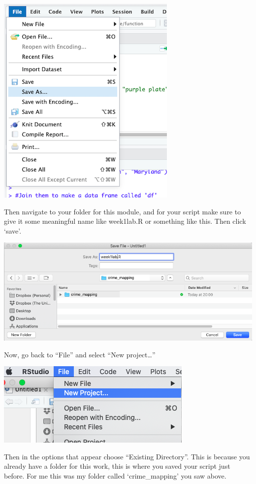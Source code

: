 \documentclass[
]{book}
\begin{document}
\includegraphics{img/save_script_as.png}

Then navigate to your folder for this module, and for your script make sure to give it some meaningful name like week1lab.R or something like this. Then click `save'.

\includegraphics{img/rename_and_save.png}

Now, go back to ``File'' and select ``New project\ldots{}''

\includegraphics{img/file_newproj.png}

Then in the options that appear choose ``Existing Directory''. This is because you already have a folder for this work, this is where you saved your script just before. For me this was my folder called `crime\_mapping' you saw above.
\end{document}
